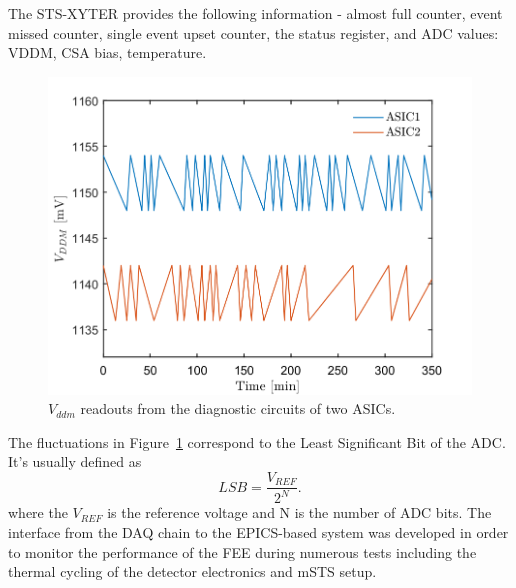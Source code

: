 The STS-XYTER provides the following information - almost full counter, event missed counter, single event upset counter, the status register, and \gls{ADC} values: VDDM, \gls{CSA} bias, temperature. 

\begin{figure}[!h]
    \centering
    \includegraphics[width=0.65\columnwidth]{Chapter4/images/FEB.png}
    \caption{$V_{ddm}$ readouts from the diagnostic circuits of two ASICs.}
    \label{fig:vddm_first}
\end{figure}
The fluctuations in Figure~\ref{fig:vddm_first} correspond  to the Least Significant Bit of the \gls{ADC}. It's usually defined as
\begin{equation}
    LSB = \frac{V_{REF}}{2^{N}}.
\end{equation}
where the $V_{REF}$ is the reference voltage and N is the number of ADC bits. 
The interface from the \gls{DAQ} chain to the \gls{EPICS}-based system was developed in order to monitor the performance of the \gls{FEE} during numerous tests including the thermal cycling of the detector electronics and \gls{mSTS} setup. 

